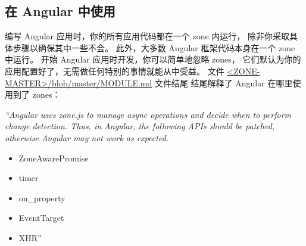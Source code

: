 \subsection{在 Angular 中使用}


编写 Angular 应用时，你的所有应用代码都在一个 zone 内运行，
除非你采取具体步骤以确保其中一些不会。
此外，大多数 Angular 框架代码本身在一个 zone 中运行。
开始 Angular 应用时开发，你可以简单地忽略 zones，
它们默认为你的应用配置好了，无需做任何特别的事情就能从中受益。
文件
\href{https://github.com/angular/zone.js/blob/master/MODULE.md}
{<ZONE-MASTER>/blob/master/MODULE.md} 文件结尾
结尾解释了 Angular 在哪里使用到了 zones：

\emph{“Angular uses zone.js to manage async operations and decide when to perform}
\emph{change detection. Thus, in Angular, the following APIs should be patched, otherwise}
\emph{Angular may not work as expected.}

\begin{itemize}
  \item ZoneAwarePromise
  \item timer
  \item on\_property
  \item EventTarget
  \item XHR”
\end{itemize}


